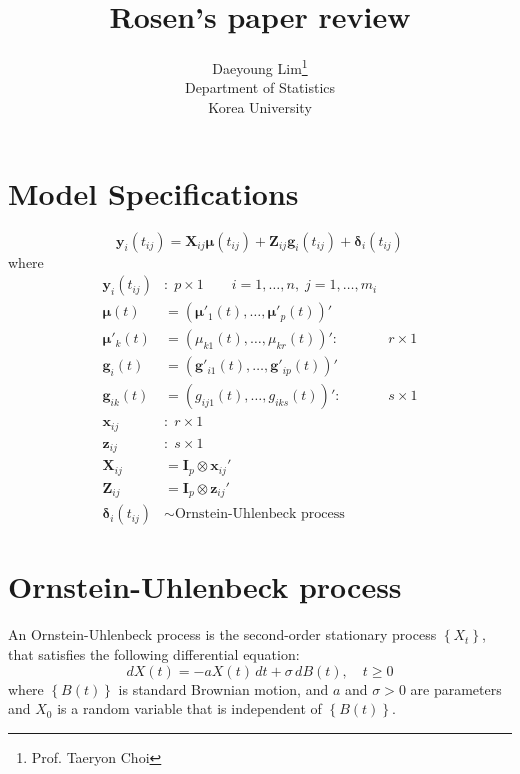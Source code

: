 \documentclass[11pt]{article}
\newcommand{\bs}{\boldsymbol}
\begin{document}
\nocite{*}

\title{Rosen's paper review}

\author{Daeyoung Lim\thanks{Prof. Taeryon Choi} \\
Department of Statistics \\
Korea University}

\maketitle
\section{Model Specifications}
  \begin{equation}
    \bs{y}_{i}\left(t_{ij}\right) = \bs{X}_{ij}\bs{\mu}\left(t_{ij}\right) + \bs{Z}_{ij}\bs{g}_{i}\left(t_{ij}\right) + \bs{\delta}_{i}\left(t_{ij}\right)
  \end{equation}
  where
  \begin{align}
    \bs{y}_{i}\left(t_{ij}\right)&:\; p\times 1 \qquad i=1,\ldots, n, \; j = 1,\ldots, m_{i}\\
    \bs{\mu}\left(t\right) &= \left(\bs{\mu}'_{1}\left(t\right), \ldots , \bs{\mu}'_{p}\left(t\right)\right)'\\
    \bs{\mu}'_{k}\left(t\right) &= \left(\mu_{k1}\left(t\right),\ldots , \mu_{kr}\left(t\right) \right)' : &r\times 1\\
    \bs{g}_{i}\left(t\right) &= \left(\bs{g}'_{i1}\left(t\right),\ldots , \bs{g}'_{ip}\left(t\right)\right)'\\
    \bs{g}_{ik}\left(t\right) &= \left(g_{ij1}\left(t\right),\ldots, g_{iks}\left(t\right)\right)':  &s \times 1\\
    \bs{x}_{ij}&:\; r \times 1\\
    \bs{z}_{ij}&:\; s\times 1\\
    \bs{X}_{ij} &= \bs{I}_{p} \otimes \bs{x}_{ij}'\\
    \bs{Z}_{ij} &= \bs{I}_{p} \otimes \bs{z}_{ij}'\\
    \bs{\delta}_{i}\left(t_{ij}\right) &\sim \text{Ornstein-Uhlenbeck process}
  \end{align}
\section{Ornstein-Uhlenbeck process}
An Ornstein-Uhlenbeck process is the second-order stationary process $\left\{X_{t}\right\}$, that satisfies the following differential equation:
\begin{equation}
  dX\left(t\right) = -aX\left(t\right)\,dt + \sigma\,dB\left(t\right), \quad t\geq 0
\end{equation}
where $\left\{B\left(t\right)\right\}$ is standard Brownian motion, and $a$ and $\sigma > 0$ are parameters and $X_{0}$ is a random variable that is independent of $\left\{B\left(t\right) \right\}$.
\end{document}
